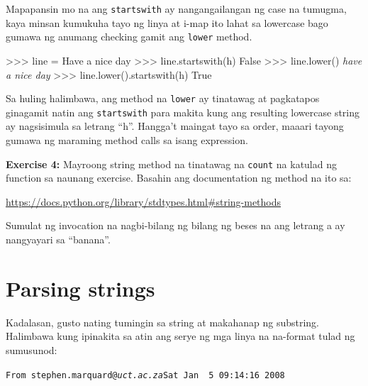 \documentclass[10pt,]{book}
\newenvironment{Shaded}{}{}
\newcommand{\CommentTok}[1]{\textcolor[rgb]{0.38,0.63,0.69}{\textit{#1}}}
\newcommand{\NormalTok}[1]{#1}
\newcommand{\OperatorTok}[1]{\textcolor[rgb]{0.40,0.40,0.40}{#1}}
\newcommand{\StringTok}[1]{\textcolor[rgb]{0.25,0.44,0.63}{#1}}
\newcommand{\VariableTok}[1]{\textcolor[rgb]{0.10,0.09,0.49}{#1}}
\begin{document}
Mapapansin mo na ang \texttt{startswith} ay nangangailangan ng case na
tumugma, kaya minsan kumukuha tayo ng linya at i-map ito lahat sa
lowercase bago gumawa ng anumang checking gamit ang \texttt{lower}
method.

\begin{Shaded}
\begin{Highlighting}[]
\OperatorTok{\textgreater{}\textgreater{}\textgreater{}}\NormalTok{ line }\OperatorTok{=} \StringTok{\textquotesingle{}Have a nice day\textquotesingle{}}
\OperatorTok{\textgreater{}\textgreater{}\textgreater{}}\NormalTok{ line.startswith(}\StringTok{\textquotesingle{}h\textquotesingle{}}\NormalTok{)}
\VariableTok{False}
\OperatorTok{\textgreater{}\textgreater{}\textgreater{}}\NormalTok{ line.lower()}
\CommentTok{\textquotesingle{}have a nice day\textquotesingle{}}
\OperatorTok{\textgreater{}\textgreater{}\textgreater{}}\NormalTok{ line.lower().startswith(}\StringTok{\textquotesingle{}h\textquotesingle{}}\NormalTok{)}
\VariableTok{True}
\end{Highlighting}
\end{Shaded}

Sa huling halimbawa, ang method na \texttt{lower} ay tinatawag at
pagkatapos ginagamit natin ang \texttt{startswith} para makita kung ang
resulting lowercase string ay nagsisimula sa letrang ``h''. Hangga't
maingat tayo sa order, maaari tayong gumawa ng maraming method calls sa
isang expression.

 

\textbf{Exercise 4:} Mayroong string method na tinatawag na
\texttt{count} na katulad ng function sa naunang exercise. Basahin ang
documentation ng method na ito sa:

\url{https://docs.python.org/library/stdtypes.html\#string-methods}

Sumulat ng invocation na nagbi-bilang ng bilang ng beses na ang letrang
a ay nangyayari sa ``banana''.

\section{Parsing strings}\label{parsing-strings}

Kadalasan, gusto nating tumingin sa string at makahanap ng substring.
Halimbawa kung ipinakita sa atin ang serye ng mga linya na na-format
tulad ng sumusunod:

\texttt{From\ stephen.marquard@}\emph{\texttt{uct.ac.za}}\texttt{Sat\ Jan\ \ 5\ 09:14:16\ 2008}
\end{document}
